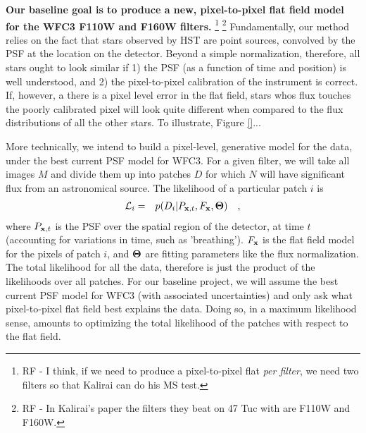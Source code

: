 \documentclass[12pt]{article}
\begin{document}
\textbf{Our baseline goal is to produce a new, pixel-to-pixel
  flat field model for the WFC3 F110W and F160W filters.} \footnote{RF
  - I think, if we need to produce a pixel-to-pixel flat \emph{per
    filter}, we need two filters so that Kalirai can do his MS test.}
\footnote{RF - In Kalirai's paper the filters they beat on 47 Tuc with
  are F110W and F160W.}  Fundamentally, our method relies on the fact
that stars observed by HST are point sources, convolved by the PSF at
the location on the detector.  Beyond a simple normalization,
therefore, all stars ought to look similar if 1) the PSF (as a
function of time and position) is well understood, and 2) the
pixel-to-pixel calibration of the instrument is correct.  If, however,
a there is a pixel level error in the flat field, stars whos flux
touches the poorly calibrated pixel will look quite different when
compared to the flux distributions of all the other stars.  To
illustrate, Figure \ref{}...

More technically, we intend to build a pixel-level, generative model
for the data, under the best current PSF model for WFC3.  For a given
filter, we will take all images $M$ and divide them up into patches $D$
for which $N$ will have significant flux from an astronomical source.
The likelihood of a particular patch $i$ is 
\begin{eqnarray}
\mathcal{L}_i & = & p(D_i|P_{{\bf x},t},F_{{\bf x}},{\bf \Theta})
\quad ,
\end{eqnarray}
where $P_{{\bf x},t}$ is the PSF over the spatial region of the
detector, at time $t$ (accounting for variations in time, such as
'breathing').  $F_{{\bf x}}$ is the flat field model for the pixels of
patch $i$, and ${\bf \Theta}$ are fitting parameters like the flux
normalization.  The total likelihood
for all the data, therefore is just the product of the likelihoods
over all patches.  For our baseline project, we will assume the best
current PSF model for WFC3 (with associated uncertainties) and only
ask what pixel-to-pixel flat field best explains the data.  Doing so,
in a maximum likelihood sense, amounts to optimizing the total
likelihood of the patches with respect to the flat field.
\end{document}
